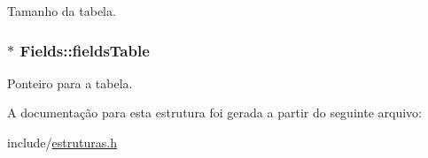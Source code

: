 Tamanho da tabela. 

\subsubsection[{\texorpdfstring{fields\+Table}{fieldsTable}}]{$\ast$ Fields\+::fields\+Table}\hypertarget{struct_fields_a6ec79b0bb356e60d228bce5980680779}{}\label{struct_fields_a6ec79b0bb356e60d228bce5980680779}


Ponteiro para a tabela. 



A documentação para esta estrutura foi gerada a partir do seguinte arquivo\+:\begin{DoxyCompactItemize}
\item 
include/\hyperlink{estruturas_8h}{estruturas.\+h}\end{DoxyCompactItemize}
